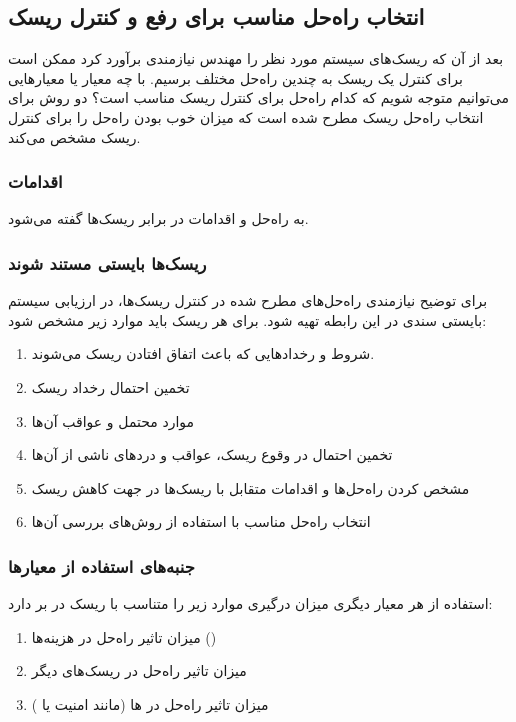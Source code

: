 \subsection{انتخاب راه‌حل مناسب برای رفع و کنترل ریسک}

بعد از آن که ریسک‌های سیستم مورد نظر را مهندس نیازمندی برآورد کرد ممکن است برای
کنترل یک ریسک به چندین راه‌حل مختلف برسیم. با چه معیار یا معیار‌هایی می‌توانیم
متوجه شویم که کدام راه‌حل برای کنترل ریسک مناسب است؟ دو روش برای انتخاب راه‌حل
ریسک مطرح شده است که میزان خوب بودن راه‌حل را برای کنترل ریسک مشخص می‌کند.

\subsubsection{اقدامات}

 به راه‌حل و اقدامات در برابر ریسک‌ها گفته می‌شود.

\subsubsection{ریسک‌ها بایستی مستند شوند}

برای توضیح نیازمندی راه‌حل‌های مطرح شده در کنترل ریسک‌ها، در ارزیابی سیستم
بایستی سندی در این رابطه تهیه شود. برای هر ریسک باید موارد زیر مشخص شود:

\begin{enumerate}
    \item شروط و رخداد‌هایی که باعث اتفاق افتادن ریسک می‌شوند.
    \item تخمین احتمال رخداد ریسک
    \item موارد محتمل و عواقب آن‌ها
    \item تخمین احتمال در وقوع ریسک، عواقب و درد‌های ناشی از آن‌ها
    \item مشخص کردن راه‌حل‌ها و اقدامات متقابل با ریسک‌ها در جهت کاهش ریسک
    \item انتخاب راه‌حل مناسب با استفاده از روش‌های بررسی آن‌ها
\end{enumerate}

\subsubsection{جنبه‌های استفاده از معیار‌ها}

استفاده از هر معیار دیگری میزان درگیری موارد زیر را متناسب با ریسک در بر دارد:

\begin{enumerate}
    \item میزان تاثیر راه‌حل در هزینه‌ها ()
    \item میزان تاثیر راه‌حل در ریسک‌های دیگر
    \item میزان تاثیر راه‌حل در ها (مانند امنیت یا )
\end{enumerate}

